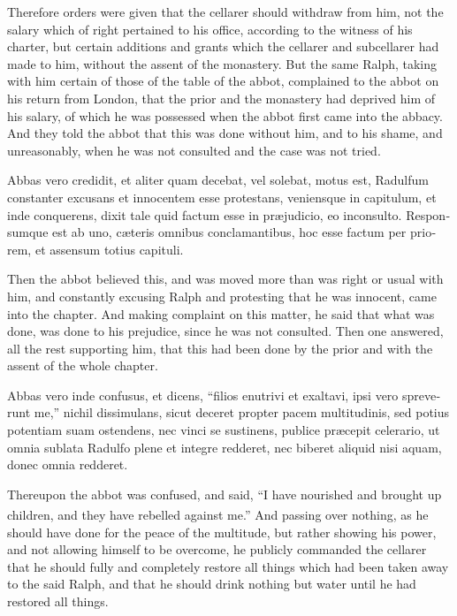 \documentclass[10pt]{book}
\newcounter{engnote}
\newcommand{\engnotenum}{\textsuperscript{\arabic{engnote}\stepcounter{engnote}}}
\newcommand{\engnotetext}[1]{\vphantom{\footnotemark{}}\footnotetext{#1}}
\begin{document}
\begin{paracol}{2}
\switchcolumn

Therefore orders were given that the cellarer should withdraw from him, not the salary which of right pertained to his office, according to the witness of his charter, but certain additions and grants which the cellarer and subcellarer had made to him, without the assent of the monastery. But the same Ralph, taking with him certain of those of the table of the abbot, complained to the abbot on his return from London, that the prior and the monastery had deprived him of his salary, of which he was possessed when the abbot first came into the abbacy. And they told the abbot that this was done without him, and to his shame, and unreasonably, when he was not consulted and the case was not tried.

\switchcolumn*

\begin{otherlanguage}{latin}
Abbas vero credidit, et aliter quam decebat, vel solebat, motus est, Radulfum constanter excusans et innocentem esse protestans, veniensque in capitulum, et inde conquerens, dixit tale quid factum esse in pr\ae{}judicio, eo inconsulto. Responsumque est ab uno, c\ae{}teris omnibus conclamantibus, hoc esse factum per priorem, et assensum totius capituli.
\end{otherlanguage}

\switchcolumn

Then the abbot believed this, and was moved more than was right or usual with him, and constantly excusing Ralph and protesting that he was innocent, came into the chapter. And making complaint on this matter, he said that what was done, was done to his prejudice, since he was not consulted. Then one answered, all the rest supporting him, that this had been done by the prior and with the assent of the whole chapter.

\switchcolumn*

\begin{otherlanguage}{latin}
Abbas vero inde confusus, et dicens, ``filios enutrivi et exaltavi, ipsi vero spreverunt me,''\engnotetext{Isai.\ i., \oldstylenums{2}.} nichil dissimulans, sicut deceret propter pacem multitudinis, sed potius potentiam suam ostendens, nec vinci se sustinens, publice pr\ae{}cepit celerario, ut omnia sublata Radulfo plene et integre redderet, nec biberet aliquid nisi aquam, donec omnia redderet.
\end{otherlanguage}

\switchcolumn

Thereupon the abbot was confused, and said, ``I have nourished and brought up children, and they have rebelled against me.''\engnotenum{} And passing over nothing, as he should have done for the peace of the multitude, but rather showing his power, and not allowing himself to be overcome, he publicly commanded the cellarer that he should fully and completely restore all things which had been taken away to the said Ralph, and that he should drink nothing but water until he had restored all things.


\end{paracol}
\end{document}
